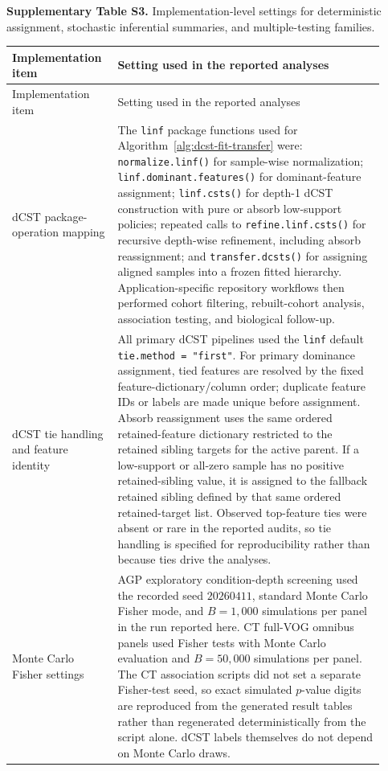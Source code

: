 \begin{landscape}
\clearpage

\noindent\textbf{Supplementary Table S3.} Implementation-level settings for
deterministic assignment, stochastic inferential summaries, and multiple-testing
families.

\begin{longtable}{p{0.24\linewidth}p{0.68\linewidth}}
\toprule
Implementation item & Setting used in the reported analyses \\
\midrule
\endfirsthead
\toprule
Implementation item & Setting used in the reported analyses \\
\midrule
\endhead
\bottomrule
\endfoot
dCST package-operation mapping &
The \texttt{linf} package functions used for Algorithm~\ref{alg:dcst-fit-transfer} were: \texttt{normalize.linf()} for sample-wise normalization; \texttt{linf.dominant.features()} for dominant-feature assignment; \texttt{linf.csts()} for depth-1 dCST construction with pure or absorb low-support policies; repeated calls to \texttt{refine.linf.csts()} for recursive depth-wise refinement, including absorb reassignment; and \texttt{transfer.dcsts()} for assigning aligned samples into a frozen fitted hierarchy. Application-specific repository workflows then performed cohort filtering, rebuilt-cohort analysis, association testing, and biological follow-up. \\
\midrule
dCST tie handling and feature identity &
All primary dCST pipelines used the \texttt{linf} default \texttt{tie.method = "first"}. For primary dominance assignment, tied features are resolved by the fixed feature-dictionary/column order; duplicate feature IDs or labels are made unique before assignment. Absorb reassignment uses the same ordered retained-feature dictionary restricted to the retained sibling targets for the active parent. If a low-support or all-zero sample has no positive retained-sibling value, it is assigned to the fallback retained sibling defined by that same ordered retained-target list. Observed top-feature ties were absent or rare in the reported audits, so tie handling is specified for reproducibility rather than because ties drive the analyses. \\
\midrule
Monte Carlo Fisher settings &
AGP exploratory condition-depth screening used the recorded seed \(20260411\), standard Monte Carlo Fisher mode, and \(B=1{,}000\) simulations per panel in the run reported here. CT full-VOG omnibus panels used Fisher tests with Monte Carlo evaluation and \(B=50{,}000\) simulations per panel. The CT association scripts did not set a separate Fisher-test seed, so exact simulated \(p\)-value digits are reproduced from the generated result tables rather than regenerated deterministically from the script alone. dCST labels themselves do not depend on Monte Carlo draws. \\

\end{longtable}
\end{landscape}
